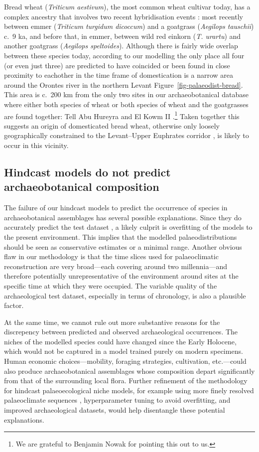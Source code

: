 \documentclass[
  authoryear,
  preprint]{elsarticle}
\begin{document}
Bread wheat (\emph{Triticum aestivum}), the most common wheat cultivar
today, has a complex ancestry that involves two recent hybridisation
events \citep{LevyFeldman2022}: most recently between emmer
(\emph{Triticum turgidum dicoccum}) and a goatgrass (\emph{Aegilops
tauschii}) c.~9 ka, and before that, in emmer, between wild red einkorn
(\emph{T. urartu}) and another goatgrass (\emph{Aegilops speltoides}).
Although there is fairly wide overlap between these species today,
according to our modelling the only place all four (or even just three)
are predicted to have coincided or been found in close proximity to
eachother in the time frame of domestication is a narrow area around the
Orontes river in the northern Levant Figure~\ref{fig-palaeodist-bread}.
This area is c.~200 km from the only two sites in our archaeobotanical
database where either both species of wheat or both species of wheat and
the goatgrasses are found together: Tell Abu Hureyra and El Kowm II
\citep{ArranzOtaeguiRoe2023}.\footnote{We are grateful to Benjamin Nowak
  for pointing this out to us.} Taken together this suggests an origin
of domesticated bread wheat, otherwise only loosely geographically
constrained to the Levant--Upper Euphrates corridor
\citep{LevyFeldman2022}, is likely to occur in this vicinity.

\subsection{Hindcast models do not predict archaeobotanical
composition}\label{hindcast-models-do-not-predict-archaeobotanical-composition}

The failure of our hindcast models to predict the occurrence of species
in archaeobotanical assemblages has several possible explanations. Since
they do accurately predict the test dataset , a likely culprit is
overfitting of the models to the present environment. This implies that
the modelled palaeodistributions should be seen as conservative
estimates or a minimal range. Another obvious flaw in our methodology is
that the time slices used for palaeoclimatic reconstruction are very
broad---each covering around two millennia---and therefore potentially
unrepresentative of the environment around sites at the specific time at
which they were occupied. The variable quality of the archaeological
test dataset, especially in terms of chronology, is also a plausible
factor.

At the same time, we cannot rule out more substantive reasons for the
discrepency between predicted and observed archaeological occurrences.
The niches of the modelled species could have changed since the Early
Holocene, which would not be captured in a model trained purely on
modern specimens. Human economic choices---mobility, foraging
strategies, cultivation, etc.---could also produce archaeobotanical
assemblages whose composition depart significantly from that of the
surrounding local flora. Further refinement of the methodology for
hindcast palaeoecological niche models, for example using more finely
resolved palaeoclimate sequences \citep[e.g.][]{KargerEtAl2023},
hyperparameter tuning to avoid overfitting, and improved archaeological
datasets, would help disentangle these potential explanations.
\end{document}
